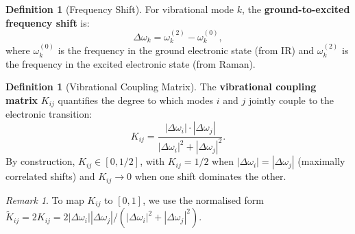 \documentclass[11pt,twocolumn,a4paper]{article}
\theoremstyle{definition}
\newtheorem{definition}[theorem]{Definition}
\theoremstyle{remark}
\newtheorem{remark}[theorem]{Remark}
\begin{document}
\begin{definition}[Frequency Shift]
\label{def:freq_shift}
For vibrational mode $k$, the \textbf{ground-to-excited frequency shift} is:
\begin{equation}
\Delta\omega_k = \omega_k^{(2)} - \omega_k^{(0)},
\end{equation}
where $\omega_k^{(0)}$ is the frequency in the ground electronic state (from IR) and $\omega_k^{(2)}$ is the frequency in the excited electronic state (from Raman).
\end{definition}

\begin{definition}[Vibrational Coupling Matrix]
\label{def:coupling_matrix}
The \textbf{vibrational coupling matrix} $K_{ij}$ quantifies the degree to which modes $i$ and $j$ jointly couple to the electronic transition:
\begin{equation}
\label{eq:coupling}
K_{ij} = \frac{|\Delta\omega_i| \cdot |\Delta\omega_j|}{|\Delta\omega_i|^2 + |\Delta\omega_j|^2}.
\end{equation}
By construction, $K_{ij} \in [0, 1/2]$, with $K_{ij} = 1/2$ when $|\Delta\omega_i| = |\Delta\omega_j|$ (maximally correlated shifts) and $K_{ij} \to 0$ when one shift dominates the other.
\end{definition}

\begin{remark}
To map $K_{ij}$ to $[0,1]$, we use the normalised form $\tilde{K}_{ij} = 2K_{ij} = 2|\Delta\omega_i||\Delta\omega_j|/(|\Delta\omega_i|^2 + |\Delta\omega_j|^2)$.
\end{remark}
\end{document}
